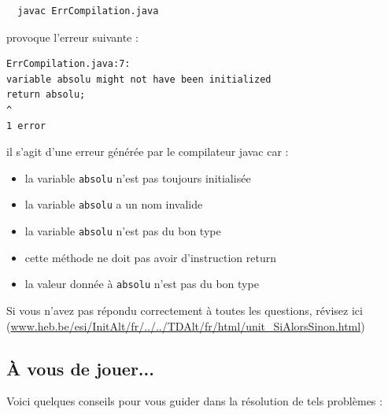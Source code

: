\documentclass[11pt,a4paper]{article}
\begin{document}
            \par
        \begin{verbatim}
  javac ErrCompilation.java 
              \end{verbatim}
                provoque l'erreur suivante :
              
            \par
        \begin{verbatim}
ErrCompilation.java:7:
variable absolu might not have been initialized
return absolu;
^
1 error  
              \end{verbatim}
                il s'agit d'une erreur g\'en\'er\'ee par le compilateur javac car :
              
            \par
        
            \begin{itemize} 
        
            \item[ \ding{"6D} ] 
              la variable \verb|absolu| n'est pas toujours initialis\'ee
            
        
            \item[ \ding{"6D} ] la variable \verb|absolu| a un nom invalide 
        
            \item[ \ding{"6D} ] la variable \verb|absolu| n'est pas du bon type 
        
            \item[ \ding{"6D} ] cette m\'ethode ne doit pas avoir d'instruction return 
        
            \item[ \ding{"6D} ] la valeur donn\'ee \`a \verb|absolu| n'est pas du bon type 
        
            \end{itemize} 
        Si vous n'avez pas r\'epondu correctement \`a toutes les questions, 
        r\'evisez ici (\url{www.heb.be/esi/InitAlt/fr/../../TDAlt/fr/html/unit\_SiAlorsSinon.html})
            \par
        \subsection{\`A vous de jouer...}
          Voici quelques conseils pour vous guider dans la r\'esolution de tels probl\`emes :
          
\end{document}
